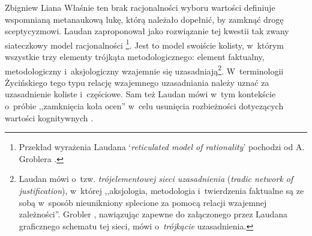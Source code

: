\begin{artplenv}{Zbigniew Liana}
Właśnie ten brak racjonalności wyboru wartości definiuje wspomnianą metanaukową lukę, którą należało dopełnić, by zamknąć drogę sceptycyzmowi. Laudan zaproponował jako rozwiązanie tej kwestii tak zwany siateczkowy model racjonalności
\parencites[][s.~62–66]{laudan_science_1984}[][s.~20n]{grobler_prawda_1993}%
\footnote{Przekład wyrażenia Laudana ‘\textit{reticulated model of rationality}' pochodzi od A. Groblera 
\parencite*[][]{grobler_prawda_1993}.%
}. Jest to model swoiście kolisty, w~którym wszystkie trzy elementy trójkąta metodologicznego: element faktualny, metodologiczny i~aksjologiczny wzajemnie się uzasadniają\footnote{Laudan 
\parencite*[][s.~63]{laudan_science_1984} %
 mówi o~tzw. \textit{trójelementowej sieci uzasadnienia} (\textit{tradic network of justification}), w~której ,,aksjologia, metodologia i~twierdzenia faktualne są ze sobą w~sposób nieunikniony splecione za pomocą relacji wzajemnej zależności''. Grobler 
\parencite*[][s.~21]{grobler_prawda_1993}, %
 nawiązując zapewne do załączonego przez Laudana graficznego schematu tej sieci, mówi o~\textit{trójkącie} uzasadnienia.}. W~terminologii Życińskiego tego typu relację wzajemnego uzasadniania należy uznać za uzasadnienie koliste i~częściowe. Sam też Laudan mówi w~tym kontekście o~próbie ,,zamknięcia koła ocen'' w~celu usunięcia rozbieżności dotyczących wartości kognitywnych 
\parencite[][s.~42]{laudan_science_1984}.%



\end{artplenv}
